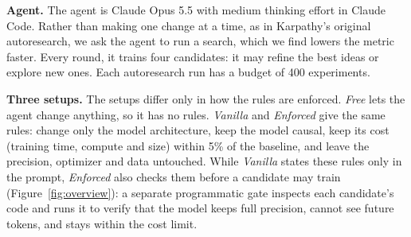 \documentclass{article}
\begin{document}
\textbf{Agent.} The agent is Claude Opus 5.5 with medium thinking effort in Claude Code. Rather than making one change at a time, as in Karpathy's original autoresearch, we ask the agent to run a search, which we find lowers the metric faster. Every round, it trains four candidates: it may refine the best ideas or explore new ones. Each autoresearch run has a budget of 400 experiments.

\textbf{Three setups.} The setups differ only in how the rules are enforced. \emph{Free} lets the agent change
anything, so it has no rules. \emph{Vanilla} and \emph{Enforced} give the same rules: change only the model architecture, keep the model
causal, keep its cost (training time, compute and size) within 5\% of the baseline, and leave the precision, optimizer
and data untouched. While \emph{Vanilla} states these rules only in the prompt, \emph{Enforced} also checks them before a candidate may train
(Figure~\ref{fig:overview}): a separate programmatic gate inspects each candidate's code and runs it to verify that the model
keeps full precision, cannot see future tokens, and stays within the cost limit.
\end{document}
